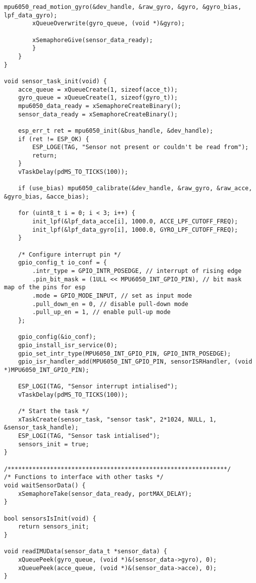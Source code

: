 \begin{lstlisting}[caption={Register Read}]
        mpu6050_read_motion_gyro(&dev_handle, &raw_gyro, &gyro, &gyro_bias, lpf_data_gyro);
        xQueueOverwrite(gyro_queue, (void *)&gyro);

        xSemaphoreGive(sensor_data_ready); 
        }
    }
}

void sensor_task_init(void) {
    acce_queue = xQueueCreate(1, sizeof(acce_t));
    gyro_queue = xQueueCreate(1, sizeof(gyro_t));
    mpu6050_data_ready = xSemaphoreCreateBinary();
    sensor_data_ready = xSemaphoreCreateBinary();

    esp_err_t ret = mpu6050_init(&bus_handle, &dev_handle);
    if (ret != ESP_OK) {
        ESP_LOGE(TAG, "Sensor not present or couldn't be read from");
        return;
    }
    vTaskDelay(pdMS_TO_TICKS(100)); 

    if (use_bias) mpu6050_calibrate(&dev_handle, &raw_gyro, &raw_acce, &gyro_bias, &acce_bias);

    for (uint8_t i = 0; i < 3; i++) {
        init_lpf(&lpf_data_acce[i], 1000.0, ACCE_LPF_CUTOFF_FREQ);
        init_lpf(&lpf_data_gyro[i], 1000.0, GYRO_LPF_CUTOFF_FREQ);
    }

    /* Configure interrupt pin */
    gpio_config_t io_conf = {
        .intr_type = GPIO_INTR_POSEDGE, // interrupt of rising edge
        .pin_bit_mask = (1ULL << MPU6050_INT_GPIO_PIN), // bit mask map of the pins for esp
        .mode = GPIO_MODE_INPUT, // set as input mode
        .pull_down_en = 0, // disable pull-down mode
        .pull_up_en = 1, // enable pull-up mode
    };
    
    gpio_config(&io_conf);
    gpio_install_isr_service(0);
    gpio_set_intr_type(MPU6050_INT_GPIO_PIN, GPIO_INTR_POSEDGE);
    gpio_isr_handler_add(MPU6050_INT_GPIO_PIN, sensorISRHandler, (void *)MPU6050_INT_GPIO_PIN);

    ESP_LOGI(TAG, "Sensor interrupt intialised");
    vTaskDelay(pdMS_TO_TICKS(100)); 

    /* Start the task */
    xTaskCreate(sensor_task, "sensor task", 2*1024, NULL, 1, &sensor_task_handle);
    ESP_LOGI(TAG, "Sensor task intialised");
    sensors_init = true; 
}

/**************************************************************/
/* Functions to interface with other tasks */
void waitSensorData() { 
    xSemaphoreTake(sensor_data_ready, portMAX_DELAY);
}

bool sensorsIsInit(void) {
    return sensors_init;
}

void readIMUData(sensor_data_t *sensor_data) {
    xQueuePeek(gyro_queue, (void *)&(sensor_data->gyro), 0);
    xQueuePeek(acce_queue, (void *)&(sensor_data->acce), 0);
}


\end{lstlisting}
